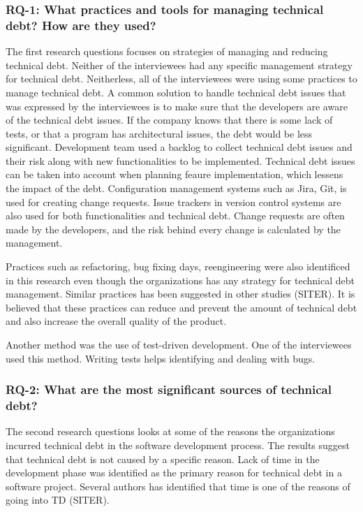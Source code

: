 \subsubsection{RQ-1: What practices and tools for managing technical debt? How are they used?}
The first research questions focuses on strategies of managing and reducing technical debt. Neither of the interviewees had any specific management strategy for technical debt. Neitherless, all of the interviewees were using some practices to manage technical debt. A common solution to handle technical debt issues that was expressed by the interviewees is to make sure that the developers are aware of the technical debt issues. If the company knows that there is some lack of tests, or that a program has architectural issues, the debt would be less significant. Development team used a backlog to collect technical debt issues and their risk along with new functionalities to be implemented. Technical debt issues can be taken into account when planning feaure implementation, which lessens the impact of the debt. Configuration management systems such as Jira, Git, is used for creating change requests. Issue trackers in version control systems are also used for both functionalities and technical debt. Change requests are often made by the developers, and the risk behind every change is calculated by the management. 

Practices such as refactoring, bug fixing days, reengineering were also identificed in this research even though the organizations has any strategy for technical debt management. Similar practices has been suggested in other studies (SITER). It is believed that these practices can reduce and prevent the amount of technical debt and also increase the overall quality of the product.

Another method was the use of test-driven development. One of the interviewees used this method. Writing tests helps identifying and dealing with bugs.


\subsubsection{RQ-2: What are the most significant sources of technical debt?}
The second research questions looks at some of the reasons the organizations incurred technical debt in the software development process. The results suggest that technical debt is not caused by a specific reason. Lack of time in the development phase was identified as the primary reason for technical debt in a software project. Several authors has identified that time is one of the reasons of going into TD (SITER). 

